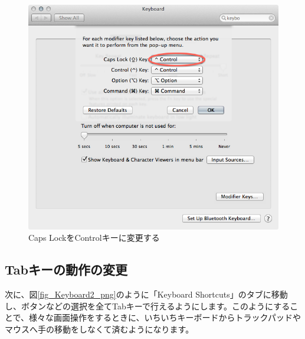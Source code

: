 \begin{figure}
  \begin{center}
    \includegraphics[scale=0.35,bb= 0 0 668 636]{fig/Keyboard1.png}
    \caption{Caps LockをControlキーに変更する}
    \label{fig_Keyboard1_png}
  \end{center}
\end{figure}

\subsection{Tabキーの動作の変更}
次に、図\ref{fig_Keyboard2_png}のように「Keyboard Shortcuts」のタブに移動し、ボタンなどの選択を全てTabキーで行えるようにします。このようにすることで、様々な画面操作をするときに、いちいちキーボードからトラックパッドやマウスへ手の移動をしなくて済むようになります。


